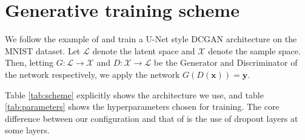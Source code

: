 \documentclass{article}
\theoremstyle{plain}
\theoremstyle{definition}
\theoremstyle{remark}
\newcommand{\vx}{\mathbf{x}}
\newcommand{\vy}{\mathbf{y}}
\begin{document}
\section{Generative training scheme}
\label{app:gen-training-scheme}
We follow the example of \citealt{shocher-ign} and train a U-Net style DCGAN architecture on the MNIST dataset. Let $\mathcal{L}$ denote the latent space and $\mathcal{X}$ denote the sample space. Then, letting ${G: \mathcal{L} \to \mathcal{X}}$ and ${D: \mathcal{X} \to \mathcal{L}}$ be the Generator and Discriminator of the network respectively, we apply the network $G(D(\vx)) = \vy$.

Table \ref{tab:scheme} explicitly shows the architecture we use, and table \ref{tab:parameters} shows the hyperparameters chosen for training. The core difference between our configuration and that of \citealt{shocher-ign} is the use of dropout layers at some layers.
\end{document}
